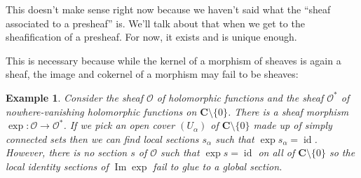 \documentclass[10pt,a4paper]{article}
\newtheorem{exam}[theo]{Example}
\newcommand{\cc}[1]{\mathcal{#1}}
\def\CC{\mathbf{C}}
\def\Im{\operatorname{Im}}
\DeclareMathOperator{\id}{id}
\begin{document}
This doesn't make sense right now because we haven't said what the ``sheaf
associated to a presheaf'' is.
We'll talk about that when we get to the sheafification of a presheaf.
For now, it exists and is unique enough.

This is necessary because while the kernel of a morphism of sheaves is again a
sheaf, the image and cokernel of a morphism may fail to be sheaves:

\begin{exam}
Consider the sheaf $\cc O$ of holomorphic functions and the sheaf
$\cc O^*$ of nowhere-vanishing holomorphic functions on $\CC \setminus \{0\}$.
There is a sheaf morphism $\exp : \cc O \to \cc O^*$.
If we pick an open cover $(U_\alpha)$ of $\CC \setminus \{0\}$ made up of
simply connected sets then we can find local sections $s_\alpha$ such that
$\exp s_\alpha = \id$.
However, there is no section $s$ of $\cc O$ such that $\exp s = \id$ on all of
$\CC \setminus \{0\}$ so the local identity sections of $\Im \exp$ fail to glue
to a global section.
\end{exam}







\end{document}
